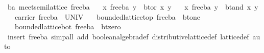 \begin{isabellebody}
\endisatagproof
{\isafoldproof}%
%
\isadelimproof
\isanewline
%
\endisadelimproof
\isanewline
{}\isamarkupfalse%
\ ba{}\ meet{}semilattice\ free{}ba\isanewline
\ \ \ {}x\ {}\isactrlbsub free{}ba\isactrlesub \ y\ {}\ bt{}or\ x\ y{}\isanewline
\ \ \ {}x\ {}\isactrlbsub free{}ba\isactrlesub \ y\ {}\ bt{}and\ x\ y{}\isanewline
\ \ \ {}carrier\ free{}ba\ {}\ UNIV{}\isanewline
\ \ \ {}bounded{}lattice{}top\ free{}ba\ {}\ bt{}one{}\isanewline
\ \ \ {}bounded{}lattice{}bot\ free{}ba\ {}\ bt{}zero{}\isanewline
%
\isadelimproof
\ \ %
\endisadelimproof
%
\isatagproof
{}\isamarkupfalse%
\ {}insert\ free{}ba{}\ simp{}all\ add{}\ boolean{}algebra{}def\ distributive{}lattice{}def\ lattice{}def{}\ auto{}%
\endisatagproof
{\isafoldproof}%
%
\isadelimproof
\isanewline

\end{isabellebody}
